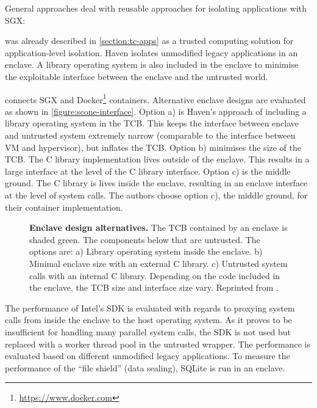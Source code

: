 General approaches deal with reusable approaches for isolating applications with SGX:\label{ID_1464987409}
\begin{description}\label{ID_1646955230}
\item[Haven\cite{Baumann2014}]\label{ID_43502325}
was already described in \autoref{section:tc-apps} as a trusted computing solution for application-level isolation.\label{ID_1905749425}
Haven isolates unmodified legacy applications in an enclave.\label{ID_1294210855}
A library operating system is also included in the enclave to minimise the exploitable interface between the enclave and the untrusted world.\label{ID_122260906}
\item[SCONE\cite{Arnautov2016}]\label{ID_1135472723}
connects SGX and Docker\footnote{\url{https://www.docker.com}} containers.\label{ID_1276523119}
Alternative enclave designs are evaluated as shown in \autoref{figure:scone-interface}.\label{ID_1410436082}
Option a) is Haven's approach of including a library operating system in the TCB.\label{ID_1158697090}
This keeps the interface between enclave and untrusted system extremely narrow (comparable to the interface between VM and hypervisor), but inflates the TCB.\label{ID_215474195}
Option b) minimises the size of the TCB. The C library implementation lives outside of the enclave. This results in a large interface at the level of the C library interface.\label{ID_663705999}
Option c) is the middle ground. The C library is lives inside the enclave, resulting in an enclave interface at the level of system calls.\label{ID_130835678}
The authors choose option c), the middle ground, for their container implementation.\label{ID_1517662441}
\begin{figure}[htbp]
\makebox[\textwidth][c]{
}\caption{\textbf{Enclave design alternatives.}\label{ID_169153882}
The TCB contained by an enclave is shaded green. The components below that are untrusted.\label{ID_1450360729}
The options are: a) Library operating system inside the enclave.\label{ID_1795355298}
b) Minimal enclave size with an external C library.\label{ID_473716305}
c) Untrusted system calls with an internal C library.\label{ID_760948667}
Depending on the code included in the enclave, the TCB size and interface size vary.\label{ID_493933912}
Reprinted from \cite{Arnautov2016}.\label{ID_1210155889}
\label{ID_1331053812}\label{figure:scone-interface}}
\end{figure}


The performance of Intel's SDK is evaluated with regards to proxying system calls from inside the enclave to the host operating system.\label{ID_428472259}
As it proves to be insufficient for handling many parallel system calls, the SDK is not used but replaced with a worker thread pool in the untrusted wrapper.\label{ID_962749451}
The performance is evaluated based on different unmodified legacy applications.\label{ID_1049539361}
To measure the performance of the ``file shield'' (data sealing), SQLite is run in an enclave.\label{ID_1694785054}


\end{description}

